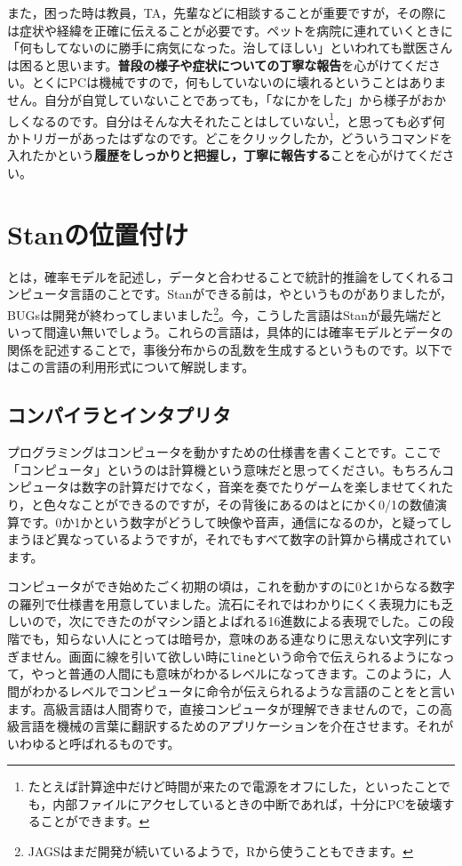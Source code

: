 \documentclass{ltjsbook}
\begin{document}
また，困った時は教員，TA，先輩などに相談することが重要ですが，その際には症状や経緯を正確に伝えることが必要です。ペットを病院に連れていくときに「何もしてないのに勝手に病気になった。治してほしい」といわれても獣医さんは困ると思います。\textbf{普段の様子や症状についての丁寧な報告}を心がけてください。とくにPCは機械ですので，何もしていないのに壊れるということはありません。自分が自覚していないことであっても，「なにかをした」から様子がおかしくなるのです。自分はそんな大それたことはしていない\footnote{たとえば計算途中だけど時間が来たので電源をオフにした，といったことでも，内部ファイルにアクセしているときの中断であれば，十分にPCを破壊することができます。}，と思っても必ず何かトリガーがあったはずなのです。どこをクリックしたか，どういうコマンドを入れたかという\textbf{履歴をしっかりと把握し，丁寧に報告する}ことを心がけてください。

\section{Stanの位置付け}

とは，確率モデルを記述し，データと合わせることで統計的推論をしてくれるコンピュータ言語のことです。Stanができる前は，やというものがありましたが，BUGsは開発が終わってしまいました\footnote{JAGSはまだ開発が続いているようで，Rから使うこともできます。}。今，こうした言語はStanが最先端だといって間違い無いでしょう。これらの言語は，具体的には確率モデルとデータの関係を記述することで，事後分布からの乱数を生成するというものです。以下ではこの言語の利用形式について解説します。

\subsection{コンパイラとインタプリタ}

プログラミングはコンピュータを動かすための仕様書を書くことです。ここで「コンピュータ」というのは計算機という意味だと思ってください。もちろんコンピュータは数字の計算だけでなく，音楽を奏でたりゲームを楽しませてくれたり，と色々なことができるのですが，その背後にあるのはとにかく0/1の数値演算です。0か1かという数字がどうして映像や音声，通信になるのか，と疑ってしまうほど異なっているようですが，それでもすべて数字の計算から構成されています。

コンピュータができ始めたごく初期の頃は，これを動かすのに0と1からなる数字の羅列で仕様書を用意していました。流石にそれではわかりにくく表現力にも乏しいので，次にできたのがマシン語とよばれる16進数による表現でした。この段階でも，知らない人にとっては暗号か，意味のある連なりに思えない文字列にすぎません。画面に線を引いて欲しい時に\texttt{line}という命令で伝えられるようになって，やっと普通の人間にも意味がわかるレベルになってきます。このように，人間がわかるレベルでコンピュータに命令が伝えられるような言語のことをと言います。高級言語は人間寄りで，直接コンピュータが理解できませんので，この高級言語を機械の言葉に翻訳するためのアプリケーションを介在させます。それがいわゆると呼ばれるものです。
\end{document}
